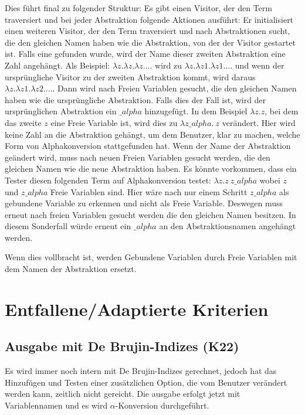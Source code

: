 \documentclass[parskip=full,11pt,twoside]{scrartcl}
\begin{document}
{	Dies führt final zu folgender Struktur:
	Es gibt einen Visitor, der den Term traversiert und bei jeder Abstraktion folgende Aktionen ausführt:
	Er initialisiert einen weiteren Visitor, der den Term traversiert und nach Abstraktionen sucht, die den gleichen Namen
	haben wie die Abstraktion, von der der Visitor gestartet ist. Falls eine gefunden wurde, wird der Name dieser zweiten
	Abstraktion eine Zahl angehängt. Als Beispiel: $\lambda z. \lambda z. \lambda z. ...$ wird zu $\lambda z. \lambda z1. \lambda z1. ...$ und wenn der ursprüngliche Visitor zu der zweiten Abstraktion kommt, wird daraus $\lambda z. \lambda z1. \lambda z2. ...$.
	Dann wird nach Freien Variablen gesucht, die den gleichen Namen haben wie die ursprüngliche Abstraktion. Falls dies
	der Fall ist, wird der ursprünglichen Abstraktion ein $\_ alpha$ hinzugefügt. In dem Beispiel $\lambda z. z$, bei dem
	das zweite $z$ eine Freie Variable ist, wird dies zu $\lambda z \_ alpha. \  z$ verändert.
	Hier wird keine Zahl an die Abstraktion gehängt, um dem Benutzer, klar zu machen, welche Form von Alphakonversion
	stattgefunden hat.
	Wenn der Name der Abstraktion geändert wird, muss  nach neuen Freien Variablen gesucht werden, die den
	gleichen Namen wie die neue Abstraktion haben. Es könnte vorkommen,
	dass ein Tester diesen folgenden Term auf Alphakonversion testet: $\lambda z. z \ z\_ alpha$ wobei $z$ und
	$z\_ alpha$ Freie Variablen sind.
	Hier wäre nach nur einem Schritt $z\_ alpha$ als gebundene Variable zu erkennen und nicht als Freie Variable.
	Deswegen muss erneut nach freien Variablen gesucht werden die den gleichen Namen besitzen.
	In diesem Sonderfall würde erneut ein $\_ alpha$ an den Abstraktionsnamen angehängt werden.
	
	Wenn dies vollbracht ist, werden Gebundene Variablen durch Freie Variablen mit dem Namen der Abstraktion ersetzt.
	
	
}


    \section{Entfallene/Adaptierte Kriterien}
    \subsection{Ausgabe mit De Brujin-Indizes (K22)}
    Es wird immer noch intern mit De Brujin-Indizes gerechnet, jedoch hat das Hinzufügen und Testen einer zusätzlichen
    Option, die vom Benutzer verändert werden kann, zeitlich nicht gereicht.
    Die ausgabe erfolgt jetzt mit Variablennamen und es wird $\alpha$-Konversion durchgeführt.
\end{document}
